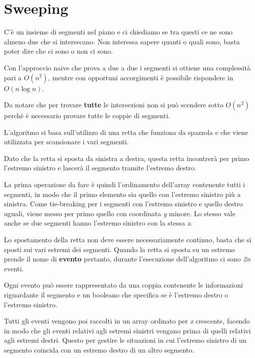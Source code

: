 \section{Sweeping}\label{sweeping}

C'è un insieme di segmenti nel piano e ci chiediamo se tra questi ce ne sono almeno due che si intersecano. Non interessa sapere quanti o quali sono, basta poter dire che ci sono o non ci sono.

Con l'approccio naive che prova a due a due i segmenti si ottiene una complessità pari a $O(n^{2})$, mentre con opportuni accorgimenti è possibile rispondere in $O(n \log n)$.

Da notare che per trovare \textbf{tutte} le intersezioni non si può scendere sotto $O(n^{2})$ perché è necessario provare tutte le coppie di segmenti.

L'algoritmo si basa sull'utilizzo di una retta che funziona da spazzola e che viene utilizzata per scansionare i vari segmenti.

Dato che la retta si sposta da sinistra a destra, questa retta incontrerà per primo l'estremo sinistro e lascerà il segmento tramite l'estremo destro.

La prima operazione da fare è quindi l'ordinamento dell'array contenente tutti i segmenti, in modo che il primo elemento sia quello con l'estremo sinistro più a sinistra. 
Come tie-breaking per i segmenti con l'estremo sinistro e quello destro uguali, viene messo per primo quello con coordinata \emph{y} minore. 
Lo stesso vale anche se due segmenti hanno l'estremo sinistro con la stessa \emph{x}.

Lo spostamento della retta non deve essere necessariamente continuo, basta che si sposti sui vari estremi dei segmenti. 
Quando la retta si sposta su un estremo prende il nome di \textbf{evento} pertanto, durante l'esecuzione dell'algoritmo ci sono \emph{2n} eventi.

Ogni evento può essere rappresentato da una coppia contenente le informazioni riguardante il segmento e un booleano che specifica se è l'estremo destro o l'estremo sinistro.

Tutti gli eventi vengono poi raccolti in un array ordinato per \emph{x} crescente, facendo in modo che gli eventi relativi agli estremi sinistri vengano prima di quelli relativi agli estremi destri. 
Questo per gestire le situazioni in cui l'estremo sinistro di un segmento coincida con un estremo destro di un altro segmento.

